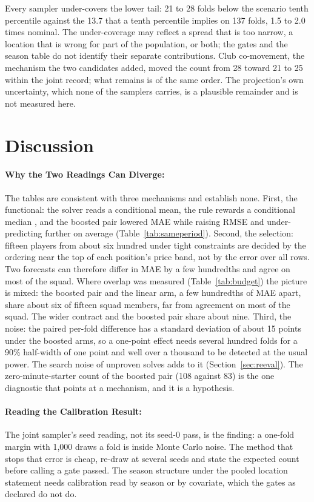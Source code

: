 \documentclass[11pt,a4paper]{article}
\begin{document}
Every sampler under-covers the lower tail: 21 to 28 folds below the scenario tenth percentile against the 13.7 that a tenth percentile implies on 137 folds, 1.5 to 2.0 times nominal. The under-coverage may reflect a spread that is too narrow, a location that is wrong for part of the population, or both; the gates and the season table do not identify their separate contributions. Club co-movement, the mechanism the two candidates added, moved the count from 28 toward 21 to 25 within the joint record; what remains is of the same order. The projection's own uncertainty, which none of the samplers carries, is a plausible remainder and is not measured here.

\section{Discussion}
\label{sec:discussion}


\paragraph{Why the Two Readings Can Diverge:} The tables are consistent with three mechanisms and establish none. First, the functional: the solver reads a conditional mean, the rule rewards a conditional median \cite{gneiting2011}, and the boosted pair lowered MAE while raising RMSE and under-predicting further on average (Table~\ref{tab:sameperiod}). Second, the selection: fifteen players from about six hundred under tight constraints are decided by the ordering near the top of each position's price band, not by the error over all rows. Two forecasts can therefore differ in MAE by a few hundredths and agree on most of the squad. Where overlap was measured (Table~\ref{tab:budget}) the picture is mixed: the boosted pair and the linear arm, a few hundredths of MAE apart, share about six of fifteen squad members, far from agreement on most of the squad. The wider contract and the boosted pair share about nine. Third, the noise: the paired per-fold difference has a standard deviation of about 15 points under the boosted arms, so a one-point effect needs several hundred folds for a 90\% half-width of one point and well over a thousand to be detected at the usual power. The search noise of unproven solves adds to it (Section~\ref{sec:reeval}). The zero-minute-starter count of the boosted pair (108 against 83) is the one diagnostic that points at a mechanism, and it is a hypothesis.


\paragraph{Reading the Calibration Result:} The joint sampler's seed reading, not its seed-0 pass, is the finding: a one-fold margin with 1{,}000 draws a fold is inside Monte Carlo noise. The method that stops that error is cheap, re-draw at several seeds and state the expected count before calling a gate passed. The season structure under the pooled location statement needs calibration read by season or by covariate, which the gates as declared do not do.
\end{document}

